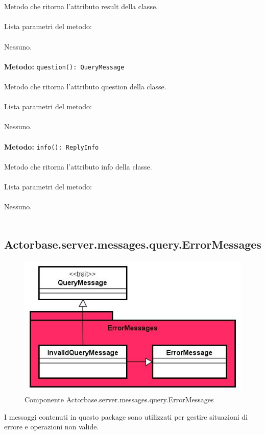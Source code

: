 \documentclass[a4paper]{article}
\begin{document}
			\\ \\
			Metodo che ritorna l'attributo result della classe.
			\\ \\
			Lista parametri del metodo:
			\\ \\
			Nessuno.
			\\ \\		
			\textbf{Metodo: } \texttt{question(): QueryMessage}
			\\ \\
			Metodo che ritorna l'attributo question della classe.
			\\ \\
			Lista parametri del metodo:
			\\ \\
			Nessuno.
			\\ \\
			\textbf{Metodo: } \texttt{info(): ReplyInfo}
			\\ \\	
			Metodo che ritorna l'attributo info della classe.
			\\ \\
			Lista parametri del metodo:
			\\ \\
			Nessuno.
			\\ \\
			
	\subsection{Actorbase.server.messages.query.ErrorMessages}
			\begin{figure}[H]
			\centering
			\includegraphics[width=\textwidth]{Server/errorMessagesLevel.jpg}
			\caption{Componente Actorbase.server.messages.query.ErrorMessages}
		\end{figure}
		I messaggi contenuti in questo package sono utilizzati per gestire situazioni di errore e operazioni non valide.
		
\end{document}
